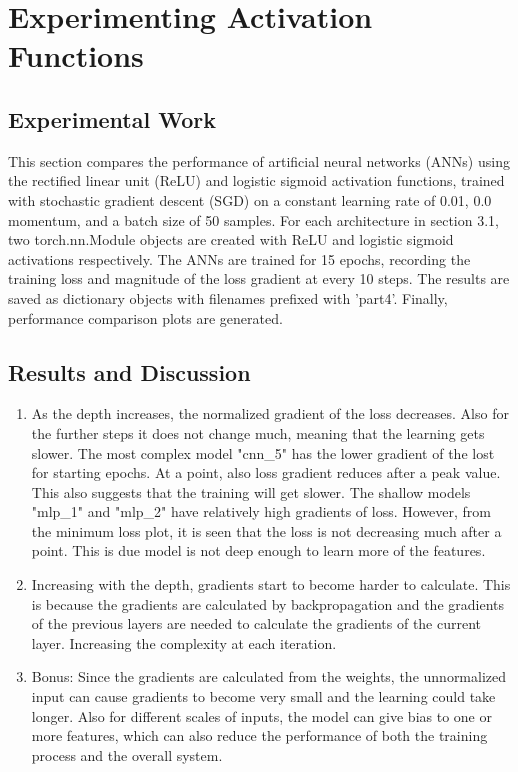 \documentclass[3p,times,procedia]{elsarticle}
\begin{document}
\section{\textbf{Experimenting Activation Functions}}

\subsection{\textbf{Experimental Work}}

This section compares the performance of artificial neural networks (ANNs) using the rectified linear unit (ReLU) and logistic sigmoid activation functions, trained with stochastic gradient descent (SGD) on a constant learning rate of 0.01, 0.0 momentum, and a batch size of 50 samples.
For each architecture in section 3.1, two torch.nn.Module objects are created with ReLU and logistic sigmoid activations respectively. The ANNs are trained for 15 epochs, recording the training loss and magnitude of the loss gradient at every 10 steps.
The results are saved as dictionary objects with filenames prefixed with 'part4'.
Finally, performance comparison plots are generated.


\subsection{\textbf{Results and Discussion}}
\begin{enumerate}
    \item As the depth increases, the normalized gradient of the loss decreases. Also for the further steps it does not change much,
    meaning that the learning gets slower.
    The most complex model "cnn\_5" has the lower gradient of the lost for starting epochs. At a point, also loss gradient reduces after a peak value. This also suggests that the training will get slower.
    The shallow models "mlp\_1" and "mlp\_2" have relatively high gradients of loss. However, from the minimum loss plot, it is seen that the loss is not decreasing much after a point. This is due model is not deep enough to learn more of the features.

    \item Increasing with the depth, gradients start to become harder to calculate. This is because the gradients are calculated by backpropagation and the gradients of the previous layers are needed to calculate the gradients of the current layer. Increasing the complexity at each iteration.
    \item Bonus: Since the gradients are calculated from the weights, the unnormalized input can cause gradients to become very small and the learning could take longer.
    Also for different scales of inputs, the model can give bias to one or more features, which can also reduce the performance of both the training process and the overall system.
\end{enumerate}
\end{document}
